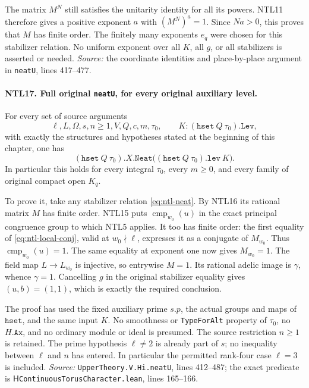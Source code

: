 The matrix \(M^N\) still satisfies the unitarity identity for all
its powers.  NTL11 therefore gives a positive exponent \(a\) with
\((M^N)^a=1\).  Since \(Na>0\), this proves that \(M\) has finite
order.  The finitely many exponents \(e_q\) were chosen for this
stabilizer relation.  No uniform exponent over all \(K\), all \(g\),
or all stabilizers is asserted or needed.
\emph{Source:} the coordinate identities and place-by-place argument
in \texttt{neatU}, lines 417--477.

\paragraph{NTL17. Full original \texttt{neatU}, for every original auxiliary level.}
\label{claim:NTL17}
For every set of source arguments
\[
 \ell,L,\Omega,s,n\ge1,V,Q,c,m,\tau _0,
 \qquad K:(\texttt{hset}\ Q\ \tau _0).\texttt{Lev},
\]
with exactly the structures and hypotheses stated at the beginning
of this chapter, one has
\[
 (\texttt{hset}\ Q\ \tau _0).X.\texttt{Neat}
            \bigl((\texttt{hset}\ Q\ \tau _0).\texttt{lev}\ K\bigr).
\]
In particular this holds for every integral \(\tau _0\), every
\(m\ge0\), and every family of original compact open \(K_q\).

To prove it, take any stabilizer relation
\eqref{eq:ntl-neat}.  By NTL16 its rational matrix \(M\) has finite
order.  NTL15 puts \(\operatorname{cmp}_{w_0}(u)\) in the exact
principal congruence group to which NTL5 applies.  It too has finite
order: the first equality of \eqref{eq:ntl-local-conj}, valid at
\(w_0\nmid\ell\), expresses it as a conjugate of \(M_{w_0}\).
Thus \(\operatorname{cmp}_{w_0}(u)=1\).  The same equality at
exponent one now gives \(M_{w_0}=1\).  The field map
\(L\longrightarrow L_{w_0}\) is injective, so entrywise \(M=1\).
Its rational adelic image is \(\gamma\), whence \(\gamma=1\).
Cancelling \(g\) in the original stabilizer equality gives
\((u,b)=(1,1)\), which is exactly the required conclusion.

The proof has used the fixed auxiliary prime \(s.p\), the actual
groups and maps of \(\texttt{hset}\), and the same input \(K\).
No smoothness or \texttt{TypeForAlt} property of \(\tau _0\), no
\(H.\texttt{Ax}\), and no ordinary module or ideal is presumed.
The source restriction \(n\ge1\) is retained.  The prime hypothesis
\(\ell\ne2\) is already part of \(s\); no inequality between
\(\ell\) and \(n\) has entered.  In particular the permitted
rank-four case \(\ell=3\) is included.
\emph{Source:} \texttt{UpperTheory.V.Hi.neatU}, lines 412--487;
the exact predicate is \(\mathsf H\)\texttt{ContinuousTorusCharacter.lean},
lines 165--166.

